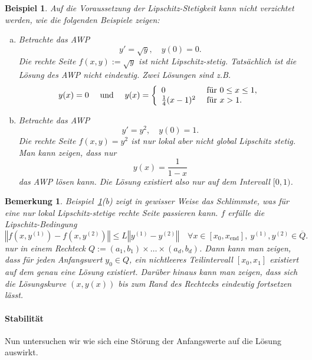 \documentclass[12pt,a4paper]{book}
\theoremstyle{break}
\newtheorem{bemerkung}[theorem]{Bemerkung}
\newtheorem{beispiel}[theorem]{Beispiel}
\theoremstyle{nonumberplain}
\newcommand{\norm}[1]{\left\Vert#1\right\Vert}		%
\newcommand{\1}{\mathbbm{1}} 			      	%
\begin{document}
\begin{beispiel}\label{bsp:PL}
Auf die Voraussetzung der Lipschitz-Stetigkeit kann nicht verzichtet werden, wie die folgenden
Beispiele zeigen:
\begin{enumerate}[(a)]
\item  Betrachte das AWP
\[
y'=\sqrt{y}, \quad y(0)=0.
\]
Die rechte Seite $f(x,y):=\sqrt{y}$ ist nicht Lipschitz-stetig. Tatsächlich ist die Lösung des AWP nicht eindeutig. Zwei Lösungen sind z.B.
\[
y(x)=0 \quad \mbox{ und } \quad y(x)=\left\{ \begin{array}{l l} 0 & \mbox{ für } 0\leq x\leq 1,\\ \frac{1}{4}(x-1)^2 & \mbox{ für } x>1.
\end{array} \right. 
\]
%
\item Betrachte das AWP
\[
y'=y^2,\quad y(0)=1.
\]
Die rechte Seite $f(x,y)=y^2$ ist nur lokal aber nicht global Lipschitz stetig. Man kann zeigen, dass nur 
\[
y(x)=\frac{1}{1-x}
\]
das AWP lösen kann. Die Lösung existiert also nur auf dem Intervall $[0,1)$.
\end{enumerate}
\end{beispiel}

\begin{bemerkung}
Beispiel~\ref{bsp:PL}(b) zeigt in gewisser Weise das Schlimmste, was für eine nur lokal Lipschitz-stetige rechte Seite passieren kann. 
$f$ erfülle die Lipschitz-Bedingung
\[
\norm{f(x,y^{(1)})-f(x,y^{(2)})}\leq L \norm{y^{(1)}-y^{(2)}} \quad \forall x\in [x_0,x_\mathrm{end}],\ y^{(1)},y^{(2)}\in \overline Q.
\]
nur in einem Rechteck $Q:=(a_1,b_1)\times \dots \times (a_d,b_d)$.
Dann kann man zeigen, dass für jeden Anfangswert $y_0\in Q$, ein nichtleeres Teilintervall $[x_0,x_1]$ existiert auf dem genau eine Lösung existiert.
Darüber hinaus kann man zeigen, dass sich die Lösungskurve $(x,y(x))$ bis zum Rand des Rechtecks eindeutig fortsetzen lässt.
\end{bemerkung}

\paragraph{Stabilität}

Nun untersuchen wir wie sich eine Störung der Anfangswerte auf die Lösung auswirkt.
\end{document}
